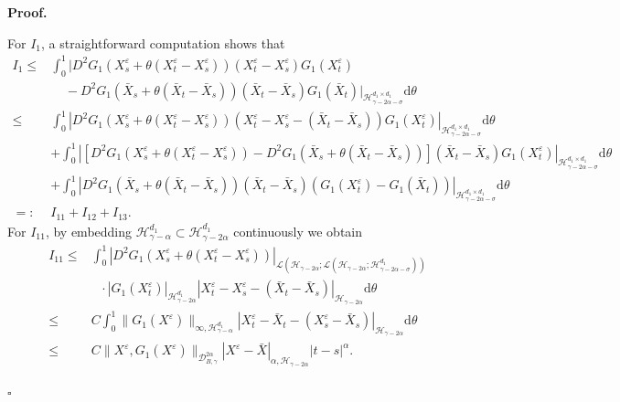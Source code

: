 \documentclass[10pt,a4paper]{article}
\numberwithin{equation}{section}
\newenvironment{proof}[1][\normalfont\bfseries Proof]{%
	\noindent #1.\hspace{0.5em}%
	\ignorespaces%
}{%
	\hfill $\square$%
	\par%
}
\begin{document}
\begin{proof}
	
	For $I_1$, a straightforward computation shows that
	\begin{align*}%
		I_1 \leq &  \int_0^1 \big|D^2 G_1 (X_s^\varepsilon+\theta(X_t^\varepsilon-X_s^\varepsilon)) (X_t^\varepsilon-X_s^\varepsilon)G_1(X_t^\varepsilon)\\
&~~~~~-D^2 G_1(\bar{X}_s+\theta(\bar{X}_t-\bar{X}_s)) (\bar{X}_t-\bar{X}_s) G_1(\bar{X}_t) \big|_{\mathcal H_{\gamma-2\alpha-\sigma}^{d_1 \times d_1}} \mathrm{d} \theta \nonumber\\
		\leq & \int_0^1 \left|D^2 G_1 (X_s^\varepsilon+\theta(X_t^\varepsilon-X_s^\varepsilon))(X_t^\varepsilon-X_s^\varepsilon-(\bar{X}_t-\bar{X}_s)) G_1(X_t^\varepsilon) \right|_{\mathcal H_{\gamma-2\alpha-\sigma}^{d_1 \times d_1}} \mathrm{d} \theta \nonumber\\
		&+\int_0^1 \left|[D^2 G_1 (X_s^\varepsilon+\theta(X_t^\varepsilon-X_s^\varepsilon))-D^2 G_1(\bar{X}_s+\theta(\bar{X}_t-\bar{X}_s))] (\bar{X}_t-\bar{X}_s) G_1(X_t^\varepsilon) \right|_{\mathcal H_{\gamma-2\alpha-\sigma}^{d_1 \times d_1}} \mathrm{d} \theta \nonumber\\
		&+\int_0^1 \left| D^2 G_1(\bar{X}_s+\theta(\bar{X}_t-\bar{X}_s)) (\bar{X}_t-\bar{X}_s) (G_1(X_t^\varepsilon)-G_1(\bar{X}_t)) \right|_{\mathcal H_{\gamma-2\alpha-\sigma}^{d_1 \times d_1}} \mathrm{d} \theta \nonumber\\
		=: & I_{11}+I_{12}+I_{13}.
	\end{align*}
	For $I_{11}$, by embedding $\mathcal H_{\gamma-\alpha}^{d_1} \subset \mathcal H_{\gamma-2\alpha}^{d_1}$ continuously we obtain
	\begin{align}\label{I11}
		I_{11} \leq & \int_0^1 |D^2 G_1 (X_s^\varepsilon+\theta(X_t^\varepsilon-X_s^\varepsilon))|_{\mathcal L (\mathcal H_{\gamma-2\alpha}; \mathcal L (\mathcal H_{\gamma-2\alpha}; \mathcal H_{\gamma-2\alpha-\sigma}^{d_1 }))} \nonumber\\
		&~~~\cdot
		|G_1(X_t^\varepsilon)|_{\mathcal H_{\gamma-2\alpha}^{d_1}} |X_t^\varepsilon-X_s^\varepsilon-(\bar{X}_t-\bar{X}_s)|_{\mathcal H_{\gamma-2\alpha}} \mathrm{d} \theta \nonumber\\
		\leq & C \int_0^1 \|G_1(X^\varepsilon)\|_{\infty,\mathcal H_{\gamma-\alpha}^{d_1}} |X_t^\varepsilon-\bar{X}_t-(X_s^\varepsilon-\bar{X}_s)|_{\mathcal H_{\gamma-2\alpha}} \mathrm{d} \theta \nonumber\\
		\leq & C  \|X^\varepsilon, G_1(X^\varepsilon)\|_{\mathcal D_{B,\gamma}^{2\alpha}} |X^\varepsilon-\bar{X}|_{\alpha, \mathcal H_{\gamma-2\alpha}} |t-s|^\alpha  .
	\end{align}	

\end{proof}
\end{document}
